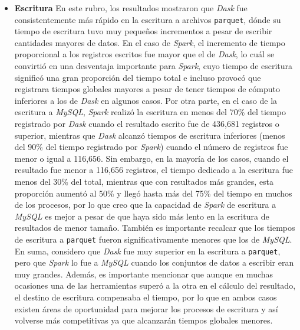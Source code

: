 \begin{itemize}
	\item \textbf{Escritura} En este rubro, los resultados mostraron que \textit{Dask} fue consistentemente más rápido en la escritura a archivos \texttt{parquet}, dónde su tiempo de escritura tuvo muy pequeños incrementos a pesar de escribir cantidades mayores de datos. En el caso de \textit{Spark}, el incremento de tiempo proporcional a los registros escritos fue mayor que el de \textit{Dask}, lo cuál se convirtió en una desventaja importante para \textit{Spark}, cuyo tiempo de escritura significó una gran proporción del tiempo total e incluso provocó que registrara tiempos globales mayores a pesar de tener tiempos de cómputo inferiores a los de \textit{Dask} en algunos casos. Por otra parte, en el caso de la escritura a \textit{MySQL}, \textit{Spark} realizó la escritura en menos del 70\% del tiempo registrado por \textit{Dask} cuando el resultado escrito fue de 436,681 registros o superior, mientras que \textit{Dask} alcanzó tiempos de escritura inferiores (menos del 90\% del tiempo registrado por \textit{Spark}) cuando el número de registros fue menor o igual a 116,656. Sin embargo, en la mayoría de los casos, cuando el resultado fue menor a 116,656 registros, el tiempo dedicado a la escritura fue menos del 30\% del total, mientras que con resultados más grandes, esta proporción aumentó al 50\% y llegó hasta más del 75\% del tiempo en muchos de los procesos, por lo que creo que la capacidad de \textit{Spark} de escritura a \textit{MySQL} es mejor a pesar de que haya sido más lento en la escritura de resultados de menor tamaño. También es importante recalcar que los tiempos de escritura a \texttt{parquet} fueron significativamente menores que los de \textit{MySQL}. En suma, considero que \textit{Dask} fue muy superior en la escritura a \texttt{parquet}, pero que \textit{Spark} lo fue a \textit{MySQL} cuando los conjuntos de datos a escribir eran muy grandes. Además, es importante mencionar que aunque en muchas ocasiones una de las herramientas superó a la otra en el cálculo del resultado, el destino de escritura compensaba el tiempo, por lo que en ambos casos existen áreas de oportunidad para mejorar los procesos de escritura y así volverse más competitivas ya que alcanzarán tiempos globales menores. 
		

\end{itemize}
